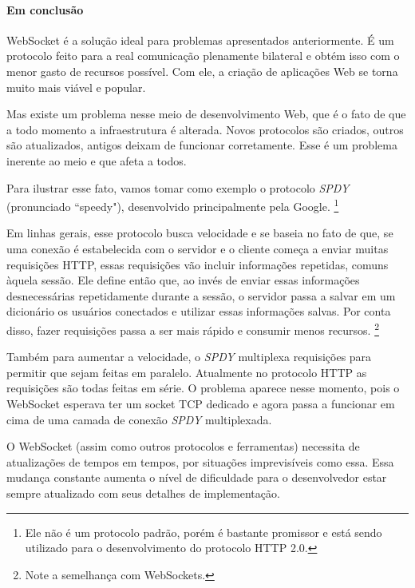 \documentclass[a4paper,12pt]{article}
\begin{document}
\newpage
\paragraph{Em conclusão}

WebSocket é a solução ideal para problemas apresentados anteriormente. É um protocolo feito para a real comunicação plenamente bilateral e obtém isso com o menor gasto de recursos possível. Com ele, a criação de aplicações Web se torna muito mais viável e popular.

Mas existe um problema nesse meio de desenvolvimento Web, que é o fato de que a todo momento a infraestrutura é alterada. Novos protocolos são criados, outros são atualizados, antigos deixam de funcionar corretamente. Esse é um problema inerente ao meio e que afeta a todos.

Para ilustrar esse fato, vamos tomar como exemplo o protocolo \emph{SPDY} (pronunciado “speedy"), desenvolvido principalmente pela Google. \footnote{Ele não é um protocolo padrão, porém é bastante promissor e está sendo utilizado para o desenvolvimento do protocolo HTTP 2.0.}

Em linhas gerais, esse protocolo busca velocidade e se baseia no fato de que, se uma conexão é estabelecida com o servidor e o cliente começa a enviar muitas requisições HTTP, essas requisições vão incluir informações repetidas, comuns àquela sessão. Ele define então que, ao invés de enviar essas informações desnecessárias repetidamente durante a sessão, o servidor passa a salvar em um dicionário os usuários conectados e utilizar essas informações salvas. Por conta disso, fazer requisições passa a ser mais rápido e consumir menos recursos. \footnote{Note a semelhança com WebSockets.}

Também para aumentar a velocidade, o \emph{SPDY} multiplexa requisições para permitir que sejam feitas em paralelo. Atualmente no protocolo HTTP as requisições são todas feitas em série. O problema aparece nesse momento, pois o WebSocket esperava ter um socket TCP dedicado e agora passa a funcionar em cima de uma camada de conexão \emph{SPDY} multiplexada.

O WebSocket (assim como outros protocolos e ferramentas) necessita de  atualizações de tempos em tempos, por situações imprevisíveis como essa. Essa mudança constante aumenta o nível de dificuldade para o desenvolvedor estar sempre atualizado com seus detalhes de implementação.
\end{document}
